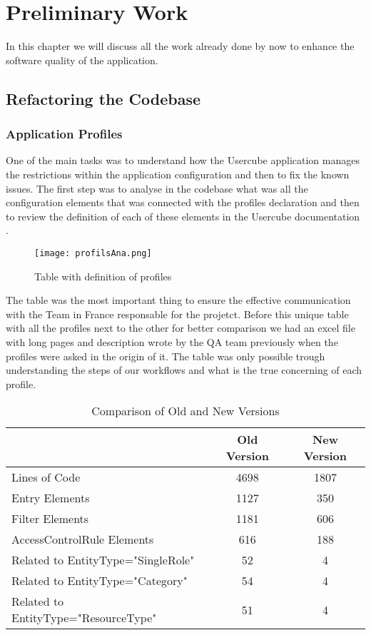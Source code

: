 %

\chapter{Preliminary Work}
\label{Preliminary Work}

In this chapter we will discuss all the work already done by now to enhance the software quality of the application.

\section{Refactoring the Codebase}

\subsection{Application Profiles}

One of the main tasks was to understand how the Usercube application manages the restrictions within the application configuration and then to fix the known issues. The first step was to analyse in the codebase what was all the configuration elements that was connected with the profiles declaration and then to review the definition of each of these elements in the Usercube documentation \cite{UsercubeDocument}.

\begin{figure}
    \centering
    \texttt{[image: profilsAna.png]}
    \caption{Table with definition of profiles}
    \label{fig:enter-label}
\end{figure}

The table was the most important thing to ensure the effective communication with the Team in France responsable for the projetct. Before this unique table with all the profiles next to the other for better comparison we had an excel file with long pages and description wrote by the QA team previously when the profiles were asked in the origin of it. The table was only possible trough understanding the steps of our workflows and what is the true concerning of each profile.

\begin{table}[h]
    \centering
    \begin{tabular}{lcc}
        \toprule
        & \textbf{Old Version} & \textbf{New Version} \\
        \midrule
        Lines of Code & 4698 & 1807 \\
        \midrule
        Entry Elements & 1127 & 350 \\
        Filter Elements & 1181 & 606 \\
        AccessControlRule Elements & 616 & 188 \\
        \quad Related to EntityType="SingleRole" & 52 & 4 \\
        \quad Related to EntityType="Category" & 54 & 4 \\
        \quad Related to EntityType="ResourceType" & 51 & 4 \\
        \bottomrule
    \end{tabular}
    \caption{Comparison of Old and New Versions}
    \label{tab:comparison}
\end{table}

